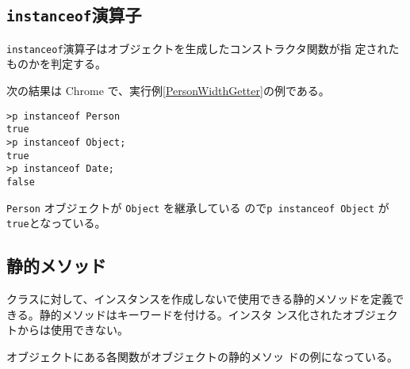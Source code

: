 \subsection{\protect\texttt{instanceof}演算子}
\texttt{instanceof}演算子はオブジェクトを生成したコンストラクタ関数が指
定されたものかを判定する。
\begin{Exec}\upshape
次の結果は Chrome で、実行例\ref{PersonWidthGetter}の例である。
\begin{Verbatim}
>p instanceof Person
true
>p instanceof Object;
true
>p instanceof Date;
false
\end{Verbatim}
\verb+Person+ オブジェクトが \verb+Object+ を継承している
 ので\texttt{p instanceof Object} が\texttt{true}となっている。
\end{Exec}
\subsection{静的メソッド}
クラスに対して、インスタンスを作成しないで使用できる静的メソッドを定義で
きる。静的メソッドはキーワードを付ける。インスタ
ンス化されたオブジェクトからは使用できない。

オブジェクトにある各関数がオブジェクトの静的メソッ
ドの例になっている。

